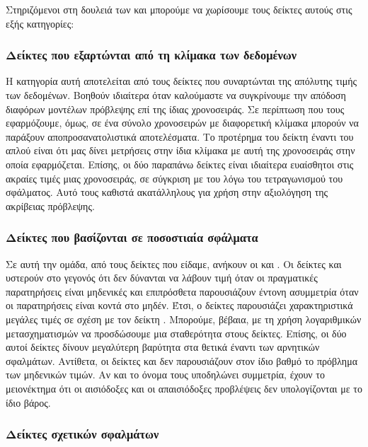 Στηριζόμενοι στη δουλειά των  και  μπορούμε να χωρίσουμε τους δείκτες αυτούς στις εξής κατηγορίες:

\subsubsection{Δείκτες που εξαρτώνται από τη κλίμακα των δεδομένων}

Η κατηγορία αυτή αποτελείται από τους δείκτες  που συναρτώνται της απόλυτης τιμής των δεδομένων. Βοηθούν ιδιαίτερα όταν καλούμαστε να συγκρίνουμε την απόδοση διαφόρων μοντέλων πρόβλεψης επί της ίδιας χρονοσειράς. Σε περίπτωση που τους εφαρμόζουμε, όμως, σε ένα σύνολο χρονοσειρών με διαφορετική κλίμακα μπορούν να παράξουν αποπροσανατολιστικά αποτελέσματα. Το προτέρημα του δείκτη  έναντι του απλού  είναι ότι μας δίνει μετρήσεις στην ίδια κλίμακα με αυτή της χρονοσειράς στην οποία εφαρμόζεται. Επίσης, οι δύο παραπάνω δείκτες είναι ιδιαίτερα ευαίσθητοι στις ακραίες τιμές μιας χρονοσειράς, σε σύγκριση με του  λόγω του τετραγωνισμού του σφάλματος. Αυτό τους καθιστά ακατάλληλους για χρήση στην αξιολόγηση της ακρίβειας πρόβλεψης.

\subsubsection{Δείκτες που βασίζονται σε ποσοστιαία σφάλματα}

Σε αυτή την ομάδα, από τους δείκτες που είδαμε, ανήκουν οι  και . Οι δείκτες  και  υστερούν στο γεγονός ότι δεν δύνανται να λάβουν τιμή όταν οι πραγματικές παρατηρήσεις είναι μηδενικές και επιπρόσθετα παρουσιάζουν έντονη ασυμμετρία όταν οι παρατηρήσεις είναι κοντά στο μηδέν. Έτσι, ο δείκτες  παρουσιάζει χαρακτηριστικά μεγάλες τιμές σε σχέση με τον δείκτη .  Μπορούμε, βέβαια, με τη χρήση λογαριθμικών μετασχηματισμών να προσδώσουμε μια σταθερότητα στους δείκτες. Επίσης, οι δύο αυτοί δείκτες δίνουν μεγαλύτερη βαρύτητα στα θετικά έναντι των αρνητικών σφαλμάτων. Αντίθετα, οι δείκτες  και  δεν παρουσιάζουν στον ίδιο βαθμό το πρόβλημα των μηδενικών τιμών. Αν και το όνομα τους υποδηλώνει συμμετρία, έχουν το μειονέκτημα ότι οι αισιόδοξες και οι απαισιόδοξες προβλέψεις δεν υπολογίζονται με το ίδιο βάρος.

\subsubsection{Δείκτες σχετικών σφαλμάτων}

